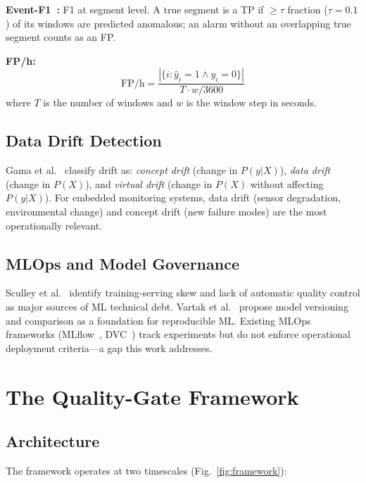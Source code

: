 \documentclass[conference]{IEEEtran}
\begin{document}
\textbf{Event-F1~\cite{tatbul2018precision}:}
F1 at segment level.
A true segment is a TP if $\geq\tau$ fraction ($\tau=0.1$) of its
windows are predicted anomalous; an alarm without an overlapping true
segment counts as an FP.

\textbf{FP/h:}
\begin{equation}
  \text{FP/h} = \frac{|\{i : \hat{y}_i = 1 \wedge y_i = 0\}|}
                      {T \cdot w / 3600}
\end{equation}
where $T$ is the number of windows and $w$ is the window step in seconds.

\subsection{Data Drift Detection}

Gama et al.~\cite{gama2014survey} classify drift as:
\emph{concept drift} (change in $P(y|X)$),
\emph{data drift} (change in $P(X)$), and
\emph{virtual drift} (change in $P(X)$ without affecting $P(y|X)$).
For embedded monitoring systems, data drift (sensor degradation, environmental
change) and concept drift (new failure modes) are the most operationally
relevant.

\subsection{MLOps and Model Governance}

Sculley et al.~\cite{sculley2015hidden} identify training-serving skew and
lack of automatic quality control as major sources of ML technical debt.
Vartak et al.~\cite{vartak2016modeldb} propose model versioning and
comparison as a foundation for reproducible ML.
Existing MLOps frameworks (MLflow~\cite{mlflow}, DVC~\cite{dvc}) track
experiments but do not enforce operational deployment criteria---a gap
this work addresses.

\section{The Quality-Gate Framework}
\label{sec:framework}

\subsection{Architecture}

The framework operates at two timescales (Fig.~\ref{fig:framework}):
\end{document}
